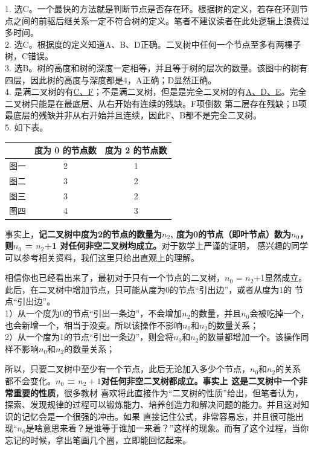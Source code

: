 \begin{exerciseanswer}
1. 选C。一个最快的方法就是判断节点是否存在环。根据树的定义，若存在环则节点之间的前驱后继关系一定不符合树的定义。笔者不建议读者在此处逻辑上浪费过多时间。\\

2. 选C。根据度的定义知道A、B、D正确。二叉树中任何一个节点至多有两棵子树，C错误。\\

3. 选B。树的高度和树的深度一定相等，并且等于树的层次的数量。该图中的树有四层，因此树的高度与深度都是4，A正确；D显然正确。\\

4. 是满二叉树的有\underline{C、F}；不是满二叉树，但是是完全二叉树的有\underline{A、D、E}。完全二叉树只能是在最底层、从右开始有连续的残缺。F项倒数
第二层存在残缺；B项最底层的残缺并非从右开始并且连续，因此F、B都不是完全二叉树。\\

5. 如下表。
\begin{center}
    \begin{tabular}{|c|c|c|}
        \hline
         & 度为 0 的节点数 & 度为 2 的节点数 \\
        \hline
        图一 & 2 & 1 \\
        \hline
        图二 & 3 & 2 \\
        \hline
        图三 & 3 & 2 \\
        \hline
        图四 & 4 & 3 \\
        \hline
    \end{tabular}
\end{center}
事实上，\textbf{记二叉树中度为2的节点的数量为\(n_2\), 度为0的节点（即叶节点）数为\(n_0\)， 则\(n_0\) = \(n_2\)+1 对任何非空二叉树均成立。}对于数学上严谨的证明，
感兴趣的同学可以参考相关资料，我们这里只给出直观上的理解。

相信你也已经看出来了，最初对于只有一个节点的二叉树，\(n_0\) = \(n_2\)+1显然成立。此后，在二叉树中增加节点，只可能从度为0的节点“引出边”，或者从度为1的
节点“引出边”。\\
1）从一个度为0的节点“引出一条边”，不会增加\(n_2\)的数量，并且\(n_0\)会被吃掉一个，也会新增一个，相当于没变。所以该操作不影响\(n_0\)和\(n_2\)的数量关系；\\
2）从一个度为1的节点“引出一条边”，则会将\(n_0\)和\(n_2\)的数量都增加一个。该操作同样不影响\(n_0\)和\(n_2\)的数量关系；

所以，只要二叉树中至少有一个节点，此后无论加入多少个节点，\(n_0\)和\(n_2\)的关系都不会变化。\textbf{\(n_0\) = \(n_2+1\)对任何非空二叉树都成立。事实上
这是二叉树中一个非常重要的性质}，很多教材
喜欢将此直接作为“二叉树的性质”给出，但笔者认为，探索、发现规律的过程可以锻炼能力、培养创造力和解决问题的能力。并且这对知识的记忆会是一个很强的冲击。如果
直接记住公式，非常容易忘，并且很可能出现“\(n_0\)是啥意思来着？是谁等于谁加一来着？”这样的现象。而有了这个过程，当你忘记的时候，拿出笔画几个圈，立即能回忆起来。\\


\end{exerciseanswer}
